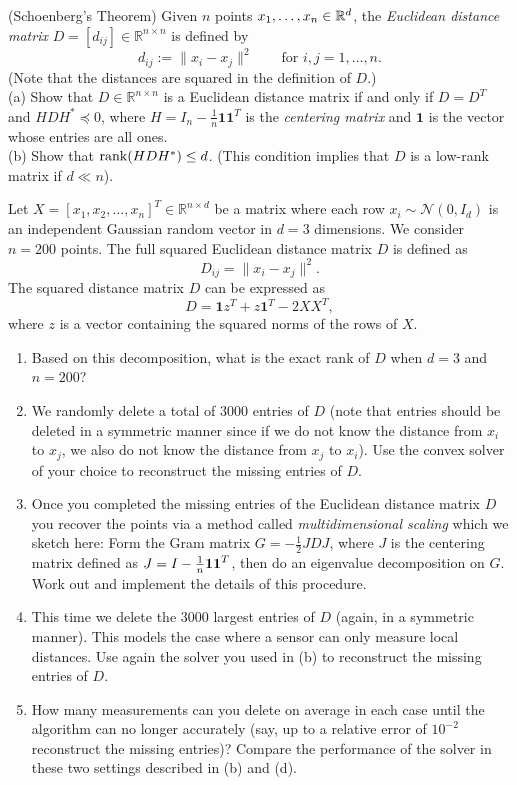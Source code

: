 \begin{myexercise} (Schoenberg's Theorem)
Given $n$ points $x_1,\dots,x_n \in \mathbb{R}^d$,
the {\em Euclidean distance matrix} 
$D = [d_{ij}] \in \mathbb{R}^{n \times n}$ is defined by
$$
d_{ij} := \|x_i - x_j\|^2
\qquad \text{for $i,j = 1,\dots,n$}.
$$
(Note that the distances are squared in the definition of $D$.)\\
(a) Show that $D \in \mathbb{R}^{n \times n}$  is a Euclidean distance matrix if and only if $D=D^T$ and
$H D H^{\ast} \preceq 0$, where $H = I_n - \frac{1}{n}\mathbf{1}\mathbf{1}^T$ is the {\em centering matrix} and
$\mathbf{1}$ is the vector whose entries are all ones.
\\
(b) Show that $\operatorname{rank}(H D H^{\ast}) \le d$.
(This condition implies that $D$ is a low-rank matrix if $d \ll n$).
\end{myexercise}



\begin{myexercise}
Let $X = [x_1, x_2, \dots, x_n]^T \in \mathbb{R}^{n \times d}$ be a matrix where each row $x_i \sim \mathcal{N}(0, I_d)$ is an independent Gaussian random vector in $d=3$ dimensions. We consider $n=200$ points. The full squared Euclidean distance matrix $D$ is defined as
$$D_{ij} = \|x_i - x_j\|^2.$$
The squared distance matrix $D$ can be expressed as
$$D = \mathbf{1}z^T + z\mathbf{1}^T - 2XX^T,$$
where $z$ is a vector containing the squared norms of the rows of $X$. 
\begin{enumerate}[label=(\alph*)]
\item
Based on this decomposition, what is the exact rank of $D$ when $d=3$ and $n=200$?
\item We randomly delete a total of 3000 entries of $D$ (note that entries should be deleted in a symmetric manner since if we do not know the distance from $x_i$ to $x_j$, we also do not know the distance from $x_j$ to $x_i$). Use the convex solver of your choice to reconstruct the missing entries of $D$. 
\item Once you completed the missing entries of the Euclidean distance matrix $D$ you recover the points via a method called {\em multidimensional scaling} which we sketch here: Form the Gram matrix $G=-\frac{1}{2}J D J$,  where $J$ is the centering matrix defined as  $J = I-\frac{1}{n} {\textbf 1} {\textbf 1}^T$, then do an eigenvalue decomposition on $G$. Work out and implement the details of this procedure.
\item This time we delete the 3000 largest entries of $D$ (again, in a symmetric manner). This models the case where a sensor can only measure local distances.
Use again the solver you used in (b) to reconstruct the missing entries of $D$. 
\item How many measurements can you delete on average in each case until the algorithm can no longer accurately (say, up to a relative error of $10^{-2}$ reconstruct the missing entries)?
Compare the performance of the solver in these two settings described in (b) and (d).
\end{enumerate}

\end{myexercise}

